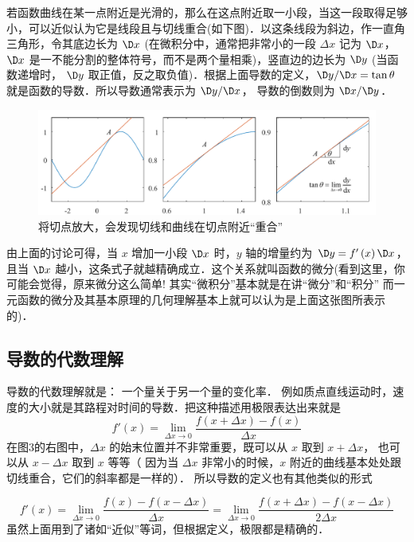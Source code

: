 若函数曲线在某一点附近是光滑的，那么在这点附近取一小段，当这一段取得足够小，可以近似认为它是线段且与切线重合(如下图)．以这条线段为斜边，作一直角三角形，令其底边长为 $\D x$ (在微积分中，通常把非常小的一段 $\Delta x$ 记为 $\D x$，  $\D x$ 是一不能分割的整体符号，而不是两个量相乘)，竖直边的边长为 $\D y$ (当函数递增时， $\D y$ 取正值，反之取负值)．根据上面导数的定义，$\D y/\D x = \tan \theta $ 就是函数的导数．所以导数通常表示为 $\D y/\D x$， 导数的倒数则为 $\D x/\D y$． 

\begin{figure}[ht]
\centering
\includegraphics[width=14cm]{./figures/Der2.pdf}
\caption{将切点放大，会发现切线和曲线在切点附近“重合”}
\end{figure}




由上面的讨论可得，当 $x$ 增加一小段 $\D x$ 时，$y$ 轴的增量约为 $\D y = f'\left( x \right)\D x$，且当 $\D x$ 越小，这条式子就越精确成立．这个关系就叫函数的微分(看到这里，你可能会觉得，原来微分这么简单! 其实“微积分”基本就是在讲“微分”和“积分” 而一元函数的微分及其基本原理的几何理解基本上就可以认为是上面这张图所表示的)．


\subsection{导数的代数理解}

导数的代数理解就是： 一个量关于另一个量的变化率． 例如质点直线运动时，速度的大小就是其路程对时间的导数．把这种描述用极限表达出来就是
\begin{equation}\label{Der_eq2}
f'\left( x \right) = \mathop {\lim }\limits_{\Delta x \to 0} \frac{{f\left( {x + \Delta x} \right) - f\left( x \right)}}{{\Delta x}}
\end{equation}
在图3的右图中，$\Delta x$ 的始末位置并不非常重要，既可以从 $x$ 取到 $x + \Delta x$， 也可以从 $x - \Delta x$  取到 $x$ 等等（ 因为当 $\Delta x$ 非常小的时候，$x$ 附近的曲线基本处处跟切线重合，它们的斜率都是一样的）． 所以导数的定义也有其他类似的形式

\begin{equation}
f'\left( x \right) = \mathop {\lim }\limits_{\Delta x \to 0} \frac{{f\left( x \right) - f\left( {x - \Delta x} \right)}}{{\Delta x}} = \mathop {\lim }\limits_{\Delta x \to 0} \frac{{f\left( {x + \Delta x} \right) - f\left( {x - \Delta x} \right)}}{{2\Delta x}}
\end{equation}
虽然上面用到了诸如“近似”等词，但根据定义，极限都是精确的．



